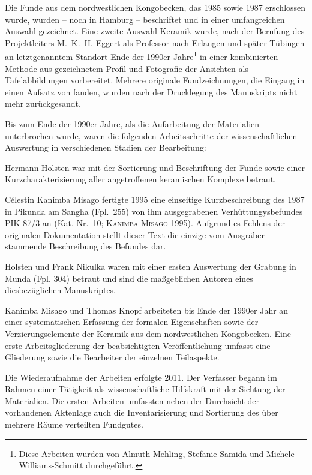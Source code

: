 Die Funde aus dem nordwestlichen Kongobecken, das 1985 sowie 1987 erschlossen wurde, wurden -- noch in Hamburg -- beschriftet und in einer umfangreichen Auswahl gezeichnet. Eine zweite Auswahl Keramik wurde, nach der Berufung des Projektleiters M.~K.~H. Eggert als Professor nach Erlangen und später Tübingen an letztgenanntem Standort Ende der 1990er Jahre\footnote{Diese Arbeiten wurden von Almuth Mehling, Stefanie Samida und Michele Williams-Schmitt durchgeführt.} in einer kombinierten Methode aus gezeichnetem Profil und Fotografie der Ansichten als Tafelabbildungen vorbereitet. Mehrere originale Fundzeichnungen, die Eingang in einen Aufsatz von \textcite{Eggert.1993} fanden, wurden nach der Drucklegung des Manuskripts nicht mehr zurückgesandt.

Bis zum Ende der 1990er Jahre, als die Aufarbeitung der Materialien unterbrochen wurde, waren die folgenden Arbeitsschritte der wissenschaftlichen Auswertung in verschiedenen Stadien der Bearbeitung:
\begin{itemize*}
\renewcommand\labelitemi{--}
\item Hermann Holsten war mit der Sortierung und Beschriftung der Funde sowie einer Kurzcharakterisierung aller angetroffenen keramischen Komplexe betraut.
\item Célestin Kanimba Misago fertigte 1995 eine einseitige Kurzbeschreibung des 1987 in Pikunda am Sangha (Fpl.~255) von ihm ausgegrabenen Verhüttungysbefundes PIK 87/3 an (Kat.-Nr.~10; \textsc{Kanimba-Misago} 1995). Aufgrund es Fehlens der originalen Dokumentation stellt dieser Text die einzige vom Ausgräber stammende Beschreibung des Befundes dar.
\item Holsten und Frank Nikulka waren mit einer ersten Auswertung der Grabung in Munda (Fpl. 304) betraut und sind die maßgeblichen Autoren eines diesbezüglichen Manuskriptes.
\item Kanimba Misago und Thomas Knopf arbeiteten bis Ende der 1990er Jahr an einer systematischen Erfassung der formalen Eigenschaften sowie der Verzierungselemente der Keramik aus dem nordwestlichen Kongobecken. Eine erste Arbeitsgliederung der beabsichtigten Veröffentlichung umfasst eine Gliederung sowie die Bearbeiter der einzelnen Teilaspekte.
\end{itemize*}

\noindent Die Wiederaufnahme der Arbeiten erfolgte 2011. Der Verfasser begann im Rahmen einer Tätigkeit als wissenschaftliche Hilfskraft mit der Sichtung der Materialien. Die ersten Arbeiten umfassten neben der Durchsicht der vorhandenen Aktenlage auch die Inventarisierung und Sortierung des über mehrere Räume verteilten Fundgutes.%

